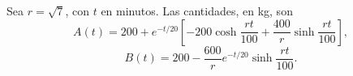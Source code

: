 Sea \(r=\sqrt7\), con \(t\) en minutos. Las cantidades, en kg, son
\[A(t)=200+e^{-t/20}\left[-200\cosh\frac{rt}{100}+\frac{400}{r}\sinh\frac{rt}{100}\right],\]
\[B(t)=200-\frac{600}{r}e^{-t/20}\sinh\frac{rt}{100}.\]
